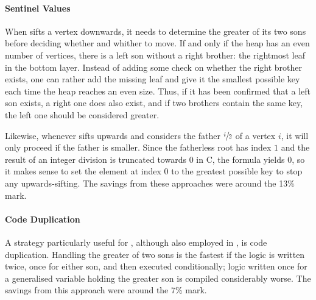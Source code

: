 \paragraph{Sentinel Values}
When \HS{} sifts a vertex downwards, it needs to determine the greater of its two sons before deciding whether and whither to move.
If and only if the heap has an even number of vertices, there is a left son without a right brother:
the rightmost leaf in the bottom layer.
Instead of adding some check on whether the right brother exists, one can rather add the missing leaf and give it the smallest possible key each time the heap reaches an even size.
Thus, if it has been confirmed that a left son exists, a right one does also exist, and if two brothers contain the same key, the left one should be considered greater.

Likewise, whenever \HS{} sifts upwards and considers the father \(\sfrac{i}{2}\) of a vertex \(i\), it will only proceed if the father is smaller.
Since the fatherless root has index \(1\) and the result of an integer division is truncated towards \(0\) in C, the formula yields \(0\), so it makes sense to set the element at index \(0\) to the greatest possible key to stop any upwards-sifting.
The savings from these approaches were around the 13\% mark.

\paragraph{Code Duplication}
A strategy particularly useful for \HS{}, although also employed in \MS{}, is code duplication.
Handling the greater of two sons is the fastest if the logic is written twice, once for either son, and then executed conditionally;
logic written once for a generalised variable holding the greater son is compiled considerably worse.
The savings from this approach were around the 7\% mark.





